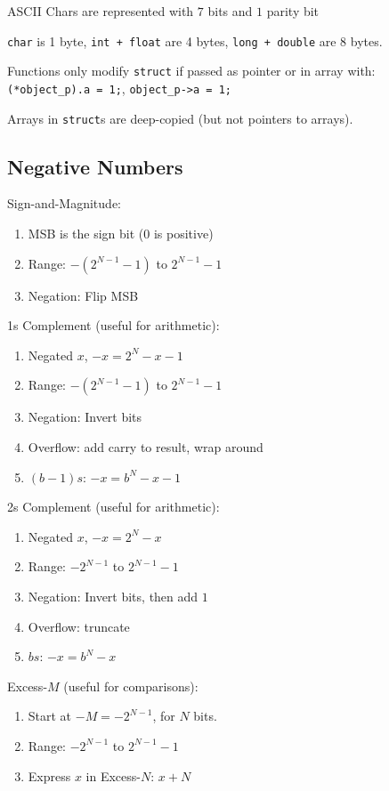 \documentclass[12pt, a4paper]{article}
\begin{document}
\begin{multicols*}{3}
ASCII Chars are represented with $7$ bits and $1$ parity bit

\lstinline|char| is 1 byte, \lstinline|int + float| are 4 bytes, \lstinline|long + double| are 8 bytes.

Functions only modify \lstinline|struct| if passed as pointer or in array with: \lstinline|(*object_p).a = 1;|, \lstinline|object_p->a = 1;|

Arrays in \lstinline|struct|s are deep-copied (but not pointers to arrays).

\colbreak
\subsection{Negative Numbers}

Sign-and-Magnitude:
\begin{enumerate}[\roman*.]
  \item MSB is the sign bit ($0$ is positive)
  \item Range: $-(2^{N-1}-1)$ to $2^{N-1}-1$
  \item Negation: Flip MSB
\end{enumerate}

1s Complement (useful for arithmetic):
\begin{enumerate}[\roman*.]
  \item Negated $x$, $-x = 2^N- x -1$
  \item Range: $-(2^{N-1}-1)$ to $2^{N-1}-1$
  \item Negation: Invert bits
  \item Overflow: add carry to result, wrap around
  \item $(b-1)s$: $-x = b^N- x -1$
\end{enumerate}

2s Complement (useful for arithmetic):
\begin{enumerate}[\roman*.]
  \item Negated $x$, $-x = 2^N- x$
  \item Range: $-2^{N-1}$ to $2^{N-1}-1$
  \item Negation: Invert bits, then add $1$
  \item Overflow: truncate 
  \item $bs$: $-x = b^N- x$
\end{enumerate}

Excess-$M$ (useful for comparisons):
\begin{enumerate}[\roman*.]
  \item Start at $-M = -2^{N-1}$, for $N$ bits.
  \item Range: $-2^{N-1}$ to $2^{N-1}-1$
  \item Express $x$ in Excess-$N$: $x + N$
\end{enumerate}


\end{multicols*}
\end{document}
